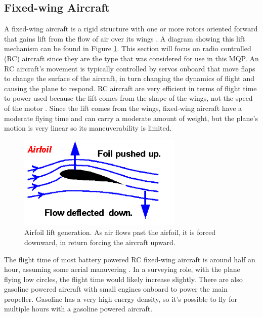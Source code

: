\subsection{Fixed-wing Aircraft}
A fixed-wing aircraft is a rigid structure with one or more rotors oriented forward that gains lift from the flow of air over its wings \cite{airplane_book}. A diagram showing this lift mechanism can be found in Figure \ref{fig:airfoil_lift}. This section will focus on radio controlled (RC) aircraft since they are the type that was considered for use in this MQP. An RC aircraft’s movement is typically controlled by servos onboard that move flaps to change the surface of the aircraft, in turn changing the dynamics of flight and causing the plane to respond. RC aircraft are very efficient in terms of flight time to power used because the lift comes from the shape of the wings, not the speed of the motor \cite{airplane_site}. Since the lift comes from the wings, fixed-wing aircraft have a moderate flying time and can carry a moderate amount of weight, but the plane’s motion is very linear so its maneuverability is limited.\par
\begin{figure}[ht]
\centering
\includegraphics[width=0.70\textwidth]{img/airfoil_lift.png}
\caption{Airfoil lift generation. As air flows past the airfoil, it is forced downward, in return forcing the aircraft upward. \cite{wing_lift_diagram}}
\label{fig:airfoil_lift}
\end{figure}\par
The flight time of most battery powered RC fixed-wing aircraft is around half an hour, assuming some aerial manuvering \cite{airplane_book}. In a surveying role, with the plane flying low circles, the flight time would likely increase slightly. There are also gasoline powered aircraft with small engines onboard to power the main propeller. Gasoline has a very high energy density, so it’s possible to fly for multiple hours with a gasoline powered aircraft.\par
